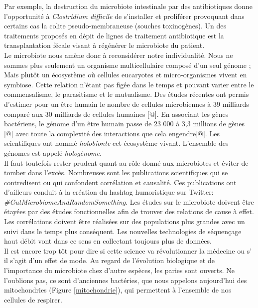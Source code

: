 \documentclass[12pt,a4paper]{article}
\begin{document}
Par exemple, la destruction du microbiote intestinale par des antibiotiques donne l'opportunité à \textit{Clostridium difficile} de s'installer et proliférer provoquant dans certains cas la colite pseudo-membraneuse  (souches toxinogènes). Un des traitements proposés en dépit de lignes de traitement antibiotique est la transplantation fécale visant à régénérer le microbiote du patient. \\
Le microbiote nous amène donc à reconsidérer notre individualité. Nous ne sommes plus seulement un organisme multicellulaire composé d'un seul génome ; Mais plutôt un écosystème où cellules eucaryotes et micro-organismes vivent en symbiose. Cette relation n'étant pas figée dans le temps et pouvant varier entre le commensalisme, le parasitisme et le mutualisme. Des études récentes ont permis d'estimer pour un être humain le nombre  de cellules microbiennes à 39 milliards comparé aux 30 milliards de cellules humaines [@]. En associant les gènes bactériens, le génome d’un être humain passe de 23 000  à 3,3 millions de gènes [@] avec toute la complexité des interactions que cela engendre[@]. Les scientifiques ont nommé \textit{holobionte} cet écosystème vivant. L'ensemble des génomes est appelé \textit{hologénome}. \\
Il faut toutefois rester prudent quant au rôle donné aux microbiotes et éviter de tomber dans l'excès. Nombreuses sont les publications scientifiques qui se contredisent ou qui confondent corrélation et causalité. Ces publications ont d'ailleurs conduit à la création du hashtag humoristique sur Twitter: \textit{\#GutMicrobiomeAndRandomSomething}. 
Les études sur le microbiote doivent être étayées par des études fonctionnelles afin de trouver des relations de cause à effet. Les corrélations doivent être réalisées sur des populations plus grandes avec un suivi dans le temps plus conséquent. Les nouvelles technologies de séquençage haut débit vont dans ce sens en collectant toujours plus de données.\\
Il est encore trop tôt pour dire si cette science va révolutionner la médecine ou s’ il s'agit d'un effet de mode. Au regard de l'évolution biologique et de l'importance du microbiote chez d'autre espèces, les paries sont ouverts. Ne l'oublions pas, ce sont d'anciennes bactéries, que nous appelons aujourd'hui des mitochondries (Figure \ref{mitochondrie}), qui permettent à l'ensemble de nos cellules de respirer. 
\end{document}
